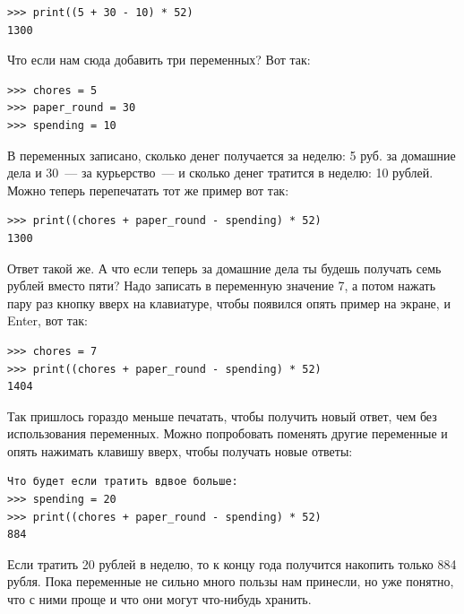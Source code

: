 \begin{listing}
\begin{verbatim}
>>> print((5 + 30 - 10) * 52)
1300
\end{verbatim}
\end{listing}

Что если нам сюда добавить три переменных? Вот так:

\begin{listing}
\begin{verbatim}
>>> chores = 5
>>> paper_round = 30
>>> spending = 10
\end{verbatim}
\end{listing}

В переменных записано, сколько денег получается за неделю: 5 руб. за домашние дела и 30 — за курьерство — и сколько денег тратится в неделю: 10 рублей. Можно теперь перепечатать тот же пример вот так:

\begin{listing}
\begin{verbatim}
>>> print((chores + paper_round - spending) * 52)
1300
\end{verbatim}
\end{listing}

Ответ такой же. А что если теперь за домашние дела ты будешь получать семь рублей вместо пяти? Надо записать в переменную  значение 7, а потом нажать пару раз кнопку вверх на клавиатуре, чтобы появился опять пример на экране, и Enter, вот так:

\begin{listing}
\begin{verbatim}
>>> chores = 7
>>> print((chores + paper_round - spending) * 52)
1404
\end{verbatim}
\end{listing}

Так пришлось гораздо меньше печатать, чтобы получить новый ответ, чем без использования переменных. Можно попробовать поменять другие переменные и опять нажимать клавишу вверх, чтобы получать новые ответы:

\begin{listing}
\begin{verbatim}
Что будет если тратить вдвое больше:
>>> spending = 20
>>> print((chores + paper_round - spending) * 52)
884
\end{verbatim}
\end{listing}

Если тратить 20 рублей в неделю, то к концу года получится накопить только 884 рубля. Пока переменные не сильно много пользы нам принесли, но уже понятно, что с ними проще и что они могут что-нибудь хранить.

